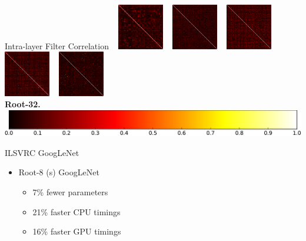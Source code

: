 \documentclass[t,xcolor=dvipsnames]{beamer}
\begin{document}
\begin{frame}[fragile]{Intra-layer Filter Correlation}
~
    \includegraphics[width=0.15\textwidth]{../Figs/Raster/ninroot32/corrcoef_conv4.png}
~
    \includegraphics[width=0.15\textwidth]{../Figs/Raster/ninroot32/corrcoef_conv5.png}
~
    \includegraphics[width=0.15\textwidth]{../Figs/Raster/ninroot32/corrcoef_conv6.png}
~
    \includegraphics[width=0.15\textwidth]{../Figs/Raster/ninroot32/corrcoef_conv8.png}
~
    \includegraphics[width=0.15\textwidth]{../Figs/Raster/ninroot32/corrcoef_conv9.png}\\
\textbf{Root-32.}\\
\includegraphics[width=0.4\linewidth]{../Figs/PDF/colorbar}
\end{frame}

\begin{frame}{ILSVRC GoogLeNet}

\begin{itemize}
    \item Root-8 (s) GoogLeNet
    \begin{itemize}
        \item 7\% fewer parameters 
        \item 21\% faster CPU timings
        \item 16\% faster GPU timings
    \end{itemize}
\end{itemize}

\end{frame}
\end{document}
